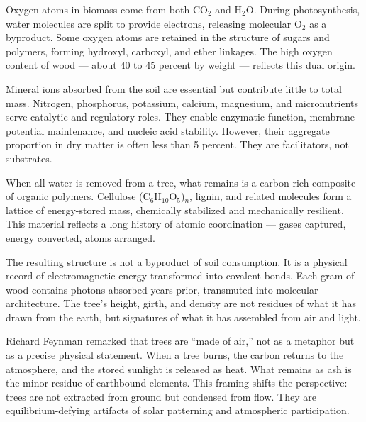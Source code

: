 Oxygen atoms in biomass come from both \(\mathrm{CO}_2\) and \(\mathrm{H}_2\mathrm{O}\). During photosynthesis, water molecules are split to provide electrons, releasing molecular \(\mathrm{O}_2\) as a byproduct. Some oxygen atoms are retained in the structure of sugars and polymers, forming hydroxyl, carboxyl, and ether linkages. The high oxygen content of wood — about 40 to 45 percent by weight — reflects this dual origin.

Mineral ions absorbed from the soil are essential but contribute little to total mass. Nitrogen, phosphorus, potassium, calcium, magnesium, and micronutrients serve catalytic and regulatory roles. They enable enzymatic function, membrane potential maintenance, and nucleic acid stability. However, their aggregate proportion in dry matter is often less than 5 percent. They are facilitators, not substrates.

When all water is removed from a tree, what remains is a carbon-rich composite of organic polymers. Cellulose (C\(_6\)H\(_{10}\)O\(_5\))\(_n\), lignin, and related molecules form a lattice of energy-stored mass, chemically stabilized and mechanically resilient. This material reflects a long history of atomic coordination — gases captured, energy converted, atoms arranged.

The resulting structure is not a byproduct of soil consumption. It is a physical record of electromagnetic energy transformed into covalent bonds. Each gram of wood contains photons absorbed years prior, transmuted into molecular architecture. The tree’s height, girth, and density are not residues of what it has drawn from the earth, but signatures of what it has assembled from air and light.

Richard Feynman remarked that trees are “made of air,” not as a metaphor but as a precise physical statement. When a tree burns, the carbon returns to the atmosphere, and the stored sunlight is released as heat. What remains as ash is the minor residue of earthbound elements. This framing shifts the perspective: trees are not extracted from ground but condensed from flow. They are equilibrium-defying artifacts of solar patterning and atmospheric participation.

